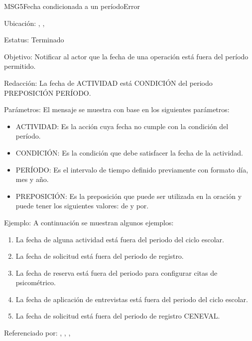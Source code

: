 \begin{mensaje}{MSG5}{Fecha condicionada a un período}{Error}
	\item[Ubicación:] \msjEmergente, \msjCampo, \msjSuperior
	\item[Estatus:] Terminado
	\item[Objetivo:] Notificar al actor que la fecha de una operación está fuera del período permitido.
	\item[Redacción:] La fecha de ACTIVIDAD está CONDICIÓN del periodo PREPOSICIÓN PERÍODO.
	\item[Parámetros:] El mensaje se muestra con base en los siguientes parámetros:
	\begin{itemize}
		\item ACTIVIDAD: Es la acción cuya fecha no cumple con la condición del período.
		\item CONDICIÓN: Es la condición que debe satisfacer la fecha de la actividad.
		\item PERÍODO: Es el intervalo de tiempo definido previamente con formato día, mes y año.
		\item PREPOSICIÓN: Es la preposición que puede ser utilizada en la oración y puede tener los siguientes valores: de y por.
	\end{itemize}
	\item[Ejemplo:] A continuación se muestran algunos ejemplos: 
	\begin{enumerate}
		\item La fecha de alguna actividad está fuera del periodo del ciclo escolar.
		\item La fecha de solicitud está fuera del periodo de registro.
		\item La fecha de reserva está fuera del periodo para configurar citas de psicométrico.
		\item La fecha de aplicación de entrevistas está fuera del periodo del ciclo escolar.
		\item La fecha de solicitud está fuera del periodo de registro CENEVAL.
	
\end{enumerate}
	
	\item[Referenciado por:] 
		, ,
		, 
\end{mensaje}